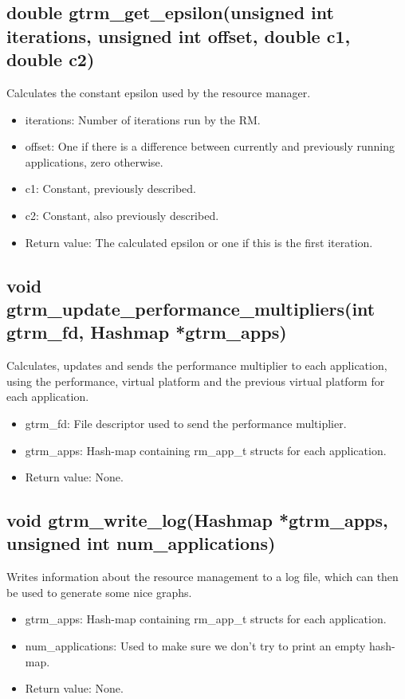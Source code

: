 \documentclass[nobiblatex]{LTHthesis}
\begin{document}
\subsection{double gtrm\_get\_epsilon(unsigned int iterations, unsigned int offset, double c1, double c2)}
Calculates the constant epsilon used by the resource manager.
\begin{itemize} 
\item iterations: Number of iterations run by the RM.
\item offset: One if there is a difference between currently and previously running applications, zero otherwise.
\item c1: Constant, previously described.
\item c2: Constant, also previously described.
\item Return value: The calculated epsilon or one if this is the first iteration.
\end{itemize}

\subsection{void gtrm\_update\_performance\_multipliers(int gtrm\_fd, Hashmap *gtrm\_apps)}
Calculates, updates and sends the performance multiplier to each application, using the performance, virtual platform and the previous virtual platform for each application.
\begin{itemize} 
\item gtrm\_fd: File descriptor used to send the performance multiplier.
\item gtrm\_apps: Hash-map containing rm\_app\_t structs for each application.
\item Return value: None.
\end{itemize}

\subsection{void gtrm\_write\_log(Hashmap *gtrm\_apps, unsigned int num\_applications)}
Writes information about the resource management to a log file, which can then be used to generate some nice graphs.
\begin{itemize} 
\item gtrm\_apps: Hash-map containing rm\_app\_t structs for each application.
\item num\_applications: Used to make sure we don't try to print an empty hash-map.
\item Return value: None.
\end{itemize}
\end{document}
